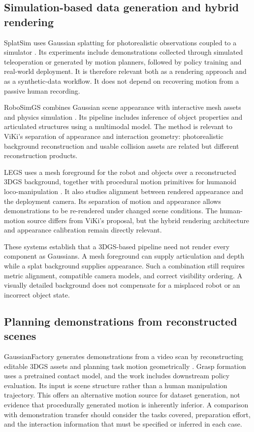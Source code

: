 \subsection{Simulation-based data generation and hybrid rendering}

SplatSim uses Gaussian splatting for photorealistic observations coupled to a
simulator \cite{splatsim}. Its experiments include demonstrations collected
through simulated teleoperation or generated by motion planners, followed by
policy training and real-world deployment. It is therefore relevant both as a
rendering approach and as a synthetic-data workflow. It does not depend on
recovering motion from a passive human recording.

RoboSimGS combines Gaussian scene appearance with interactive mesh assets and
physics simulation \cite{robosimgs}. Its pipeline includes inference of
object properties and articulated structures using a multimodal model. The
method is relevant to ViKi's separation of appearance and interaction
geometry: photorealistic background reconstruction and usable collision assets
are related but different reconstruction products.

LEGS uses a mesh foreground for the robot and objects over a reconstructed
3DGS background, together with procedural motion primitives for humanoid
loco-manipulation \cite{legs}. It also studies alignment between rendered
appearance and the deployment camera. Its separation of motion and appearance
allows demonstrations to be re-rendered under changed scene conditions. The
human-motion source differs from ViKi's proposal, but the hybrid rendering
architecture and appearance calibration remain directly relevant.

These systems establish that a 3DGS-based pipeline need not render every
component as Gaussians. A mesh foreground can supply articulation and depth
while a splat background supplies appearance. Such a combination still requires
metric alignment, compatible camera models, and correct visibility ordering.
A visually detailed background does not compensate for a misplaced robot or
an incorrect object state.

\subsection{Planning demonstrations from reconstructed scenes}

GaussianFactory generates demonstrations from a video scan by reconstructing
editable 3DGS assets and planning task motion geometrically
\cite{gaussianfactory}. Grasp formation uses a pretrained contact model, and
the work includes downstream policy evaluation. Its input is scene structure
rather than a human manipulation trajectory. This offers an alternative
motion source for dataset generation, not evidence that procedurally generated
motion is inherently inferior. A comparison with demonstration transfer should
consider the tasks covered, preparation effort, and the interaction information
that must be specified or inferred in each case.

